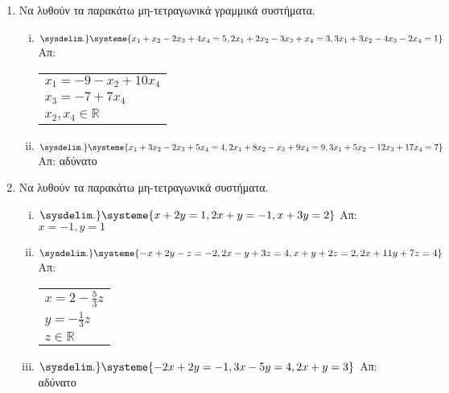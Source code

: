 \begin{enumerate}
\item Να λυθούν τα παρακάτω μη-τετραγωνικά γραμμικά συστήματα.

  \begin{enumerate}[i)]

    \item $ 
    \sysdelim.\}
    \systeme{
      x_{1}+ x_{2}-2 x_{3}+4 x_{4}=5,
      2 x_{1}+ 2 x_{2}-3 x_{3}+ x_{4}=3, 
      3 x_{1}+3 x_{2}-4 x_{3}-2 x_{4}=1
    } $ 
    \hfill Απ: \begin{tabular}{l}
      $ x_{1}=-9- x_{2}+10 x_{4} $ \\
      $ x_{3}= -7+7 x_{4} $ \\ 
      $ x_{2}, x_{4} \in \mathbb{R} $  
    \end{tabular}

  \item $ 
  \sysdelim.\}
  \systeme{
    x_{1}+3 x_{2}-2 x_{3}+5 x_{4}=4,
    2 x_{1}+8 x_{2}- x_{3}+9 x_{4}=9,
    3 x_{1}+5 x_{2}-12 x_{3}+17 x_{4}=7
  } $ 
  \hfill Απ: αδύνατο 
    \end{enumerate}

  \item Να λυθούν τα παρακάτω μη-τετραγωνικά συστήματα.

    \begin{enumerate}[i)]
      \item $ 
      \sysdelim.\}
      \systeme{
        x+2y=1,
        2x+y=-1,
        x+3 y=2 
      } $ 
      \hfill Απ: $ x=-1, y=1 $ 

    \item $ 
    \sysdelim.\}
    \systeme{
      -x+2 y-z=-2,
      2x-y+3z=4,
      x+y+2z=2,
      2x+11y+7z=4
    } $ 
    \hfill Απ:\begin{tabular}{l} 
      $ x=2- \frac{5}{3} z $ \\ 
      $ y = - \frac{1}{3} z $ \\ 
      $ z \in \mathbb{R} $
    \end{tabular}

  \item $ 
  \sysdelim.\}
  \systeme{
    -2x+2y=-1,
    3x-5y=4,
    2x+y=3
  } $ 
  \hfill Απ: αδύνατο 

    \end{enumerate}

\end{enumerate}



